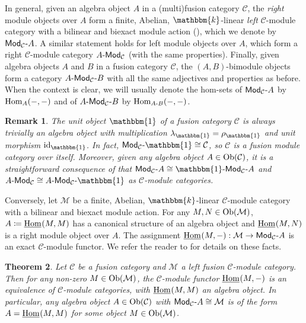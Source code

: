 \documentclass[12pt, reqno]{amsart}
\numberwithin{equation}{section}
\theoremstyle{plainspace}
\newtheorem{theorem}{Theorem}[section]
\theoremstyle{definitionspace}
\theoremstyle{remarkspace}
\newtheorem{remark}[theorem]{Remark}
\newcommand{\id}{\textup{id}}
\newcommand{\mathcat}[1]{\mathcal{#1}}
\newcommand{\Ob}{\textup{Ob}}
\newcommand{\Hom}[2][]{
	\ifthenelse{\equal{#2}{}}
		{\textup{Hom}_{#1}}
		{\textup{Hom}_{#1}\!\left(#2\right)}
}
\newcommand{\IntHom}[2][]{
	\ifthenelse{\equal{#2}{}}
		{\underline{\textup{Hom}}_{#1}}
		{\underline{\textup{Hom}}_{#1}\!\left(#2\right)}
}
\newcommand{\textcat}[1]{\textup{\textsf{#1}}}
\newcommand{\rmodcat}[2][]{\textcat{Mod}_{#1}\textcat{-}#2}
\newcommand{\lmodcat}[2][]{#2\textcat{-Mod}_{#1}}
\newcommand{\bimodcat}[3][]{#2\textcat{-Mod}_{#1}\textcat{-}#3}
\begin{document}
\noindent In general, given an algebra object $A$ in a (multi)fusion category $\mathcat{C}$, the {\em right} module objects over $A$ form a finite, Abelian, $\mathbbm{k}$-linear {\em left} $\mathcat{C}$-module category with a bilinear and biexact module action (\cite[Chapter 7.8]{Etingof_2016}), which we denote by $\rmodcat[\mathcat{C}]{A}$. A similar statement holds for left module objects over $A$, which form a right $\mathcat{C}$-module category $\lmodcat[\mathcat{C}]{A}$ (with the same properties). Finally, given algebra objects $A$ and $B$ in a fusion category $\mathcat{C}$, the $(A, B)$-bimodule objects form a category $\bimodcat[\mathcat{C}]{A}{B}$ with all the same adjectives and properties as before. When the context is clear, we will usually denote the hom-sets of $\rmodcat[\mathcat{C}]{A}$ by $\Hom[A]{-, -}$ and of $\bimodcat[\mathcat{C}]{A}{B}$ by $\Hom[A\textup{-}B]{-, -}$.
\newline

\begin{remark}\label{rem:trivial_module}
The unit object $\mathbbm{1}$ of a fusion category $\mathcat{C}$ is always trivially an algebra object with multiplication $\lambda_{\mathbbm{1}} = \rho_{\mathbbm{1}}$ and unit morphism $\id_{\mathbbm{1}}$. In fact, $\rmodcat[\mathcat{C}]{\mathbbm{1}} \cong \mathcat{C}$, so $\mathcat{C}$ is a fusion module category over itself. Moreover, given any algebra object $A \in \Ob(\mathcat{C})$, it is a straightforward consequence of \cite[Proposition 2.2.4]{Etingof_2016} that $\rmodcat[\mathcat{C}]{A} \cong \bimodcat[\mathcat{C}]{\mathbbm{1}}{A}$ and $\lmodcat[\mathcat{C}]{A} \cong \bimodcat[\mathcat{C}]{A}{\mathbbm{1}}$ as $\mathcat{C}$-module categories.
\end{remark}
\leavevmode

\noindent Conversely, let $\mathcat{M}$ be a finite, Abelian, $\mathbbm{k}$-linear $\mathcat{C}$-module category with a bilinear and biexact module action. For any $M, N \in \Ob(\mathcat{M})$, $A \coloneqq \IntHom{M, M}$ has a canonical structure of an algebra object and $\IntHom{M, N}$ is a right module object over $A$. The assignment $\IntHom{M, -} : \mathcat{M} \to \rmodcat[\mathcat{C}]{A}$ is an exact $\mathcat{C}$-module functor. We refer the reader to \cite[Section 7.9]{Etingof_2016} for details on these facts.
\newline

\begin{theorem}\label{thm:modules_from_algebras} \cite[Theorem 1]{Ostrik_2003}
Let $\mathcat{C}$ be a fusion category and $\mathcat{M}$ a left fusion $\mathcat{C}$-module category. Then for any non-zero $M \in \Ob(\mathcat{M})$, the $\mathcat{C}$-module functor $\IntHom{M, -}$ is an equivalence of $\mathcat{C}$-module categories, with $\IntHom{M, M}$ an algebra object. In particular, any algebra object $A \in \Ob(\mathcat{C})$ with $\rmodcat[\mathcat{C}]{A} \cong \mathcat{M}$ is of the form $A = \IntHom{M, M}$ for some object $M \in \Ob(\mathcat{M})$.
\end{theorem}
\leavevmode
\end{document}
